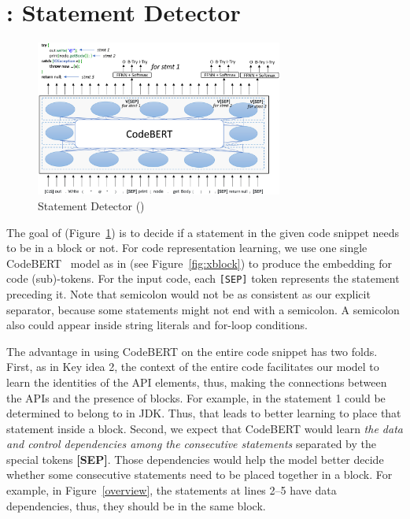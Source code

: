 \section{{\xstate}:  Statement Detector}
\label{sec:xstate}

\begin{figure}[t]
 	\centering
 	\includegraphics[width=3.2in]{xstate.png}
        \vspace{-12pt}
 	\caption{ Statement Detector ({\xstate})}
 	\label{fig:xstate}	
\end{figure}

The goal of {\xstate} (Figure~\ref{fig:xstate}) is to decide if a
statement in the given code snippet needs to be in a 
block or not. For code representation learning, we use one single
CodeBERT~\cite{codebert-emnlp20} model as in {\xblock} (see
Figure~\ref{fig:xblock}) to produce the embedding for code
(sub)-tokens. For the input code, each \texttt{[SEP]} token represents
the statement preceding it. Note that semicolon would not be as
consistent as our explicit separator, because some statements might not
end with a semicolon. A semicolon also could appear inside string
literals and for-loop conditions.

The advantage in using CodeBERT on the entire code snippet has two
folds. First, as in Key idea 2, the context of the entire code
facilitates our model to learn the identities of the API elements,
thus, making the connections between the APIs and the presence of
 blocks.  For example,  in the statement 1
could be determined to belong to  in JDK. Thus,
that leads to better learning to place that statement inside a
 block. Second, we expect that CodeBERT would learn
     {\em the data and control dependencies among the consecutive
       statements} separated by the special tokens {\bf [SEP]}. Those
     dependencies would help the model better decide whether some
     consecutive statements need to be placed together in a
      block. For example, in Figure~\ref{overview},
     the statements at lines 2--5 have data dependencies, thus, they
     should be in the same  block.

